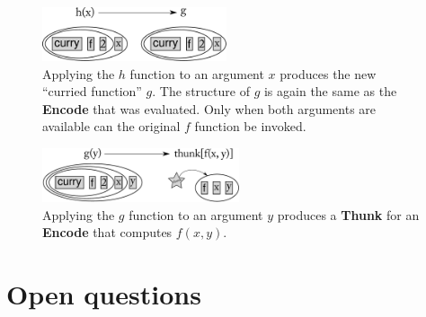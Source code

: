 \documentclass{article}
\newcommand{\encode}{\textbf{Encode}\xspace}
\newcommand{\thunk}{\textbf{Thunk}\xspace}
\begin{document}
\begin{figure}[h!]
  \begin{centering}
    \includegraphics[height=60px]{curry2.pdf}

  \end{centering}

  \caption{Applying the $h$ function to an argument $x$ produces the new ``curried function'' $g$. The structure of $g$ is again the same as the \encode that was evaluated. Only
  when both arguments are available can the original $f$ function be invoked.}
  \label{fig:curry2}
\end{figure}

\begin{figure}[h!]
  \begin{centering}
    \includegraphics[height=60px]{curry3.pdf}

  \end{centering}

  \caption{Applying the $g$ function to an argument $y$ produces a \thunk for an \encode that computes $f(x, y)$.}
  \label{fig:curry3}
\end{figure}

\section{Open questions}
\end{document}
